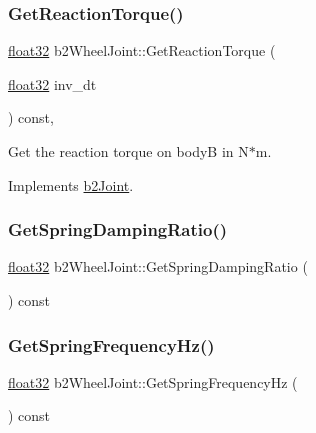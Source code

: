 \subsubsection{\texorpdfstring{GetReactionTorque()}{GetReactionTorque()}}
{\footnotesize\ttfamily \mbox{\hyperlink{b2_settings_8h_aacdc525d6f7bddb3ae95d5c311bd06a1}{float32}} b2\+Wheel\+Joint\+::\+Get\+Reaction\+Torque (\begin{DoxyParamCaption}\item[{\mbox{\hyperlink{b2_settings_8h_aacdc525d6f7bddb3ae95d5c311bd06a1}{float32}}}]{inv\+\_\+dt }\end{DoxyParamCaption}) const\hspace{0.3cm}{\ttfamily [override]}, {\ttfamily [virtual]}}



Get the reaction torque on bodyB in N$\ast$m. 



Implements \mbox{\hyperlink{classb2_joint_ae355e441c2aa842777dc04e24f15ced0}{b2\+Joint}}.

\mbox{\label{classb2_wheel_joint_a18726ad5af314531f518132d6623bc61}} 
\subsubsection{\texorpdfstring{GetSpringDampingRatio()}{GetSpringDampingRatio()}}
{\footnotesize\ttfamily \mbox{\hyperlink{b2_settings_8h_aacdc525d6f7bddb3ae95d5c311bd06a1}{float32}} b2\+Wheel\+Joint\+::\+Get\+Spring\+Damping\+Ratio (\begin{DoxyParamCaption}{ }\end{DoxyParamCaption}) const\hspace{0.3cm}{\ttfamily [inline]}}

\mbox{\label{classb2_wheel_joint_a3a22add79f238b4243407956b031c9f4}} 
\subsubsection{\texorpdfstring{GetSpringFrequencyHz()}{GetSpringFrequencyHz()}}
{\footnotesize\ttfamily \mbox{\hyperlink{b2_settings_8h_aacdc525d6f7bddb3ae95d5c311bd06a1}{float32}} b2\+Wheel\+Joint\+::\+Get\+Spring\+Frequency\+Hz (\begin{DoxyParamCaption}{ }\end{DoxyParamCaption}) const\hspace{0.3cm}{\ttfamily [inline]}}

